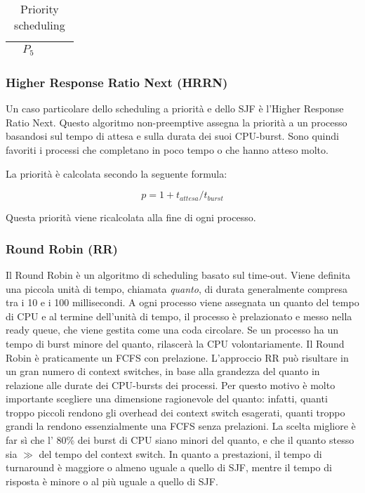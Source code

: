 \documentclass[a4paper]{article}
\begin{document}
\begin{table}[h]
\begin{tabular}{|c|ccccc|cccccccccc|ccc|c|}
                                                             & \multicolumn{5}{c|}{\cellcolor[HTML]{656565}$P_5$} & \multicolumn{10}{c|}{}                              & \multicolumn{3}{c|}{}                              &                                                                                                     \\ \hline
    \end{tabular}
    \caption{Priority scheduling}
\end{table}


\subsubsection{Higher Response Ratio Next (HRRN)}
Un caso particolare dello scheduling a priorità e dello SJF è l'Higher Response Ratio Next. Questo algoritmo non-preemptive assegna la priorità a un processo basandosi sul tempo di attesa e sulla durata dei suoi CPU-burst. Sono quindi favoriti i processi che completano in poco tempo o che hanno atteso molto.

La priorità è calcolata secondo la seguente formula:

$$
    p = 1 + t_{attesa}/t_{burst}
$$

Questa priorità viene ricalcolata alla fine di ogni processo.

\subsubsection{Round Robin (RR)}
Il Round Robin è un algoritmo di scheduling basato sul time-out. Viene definita una piccola unità di tempo, chiamata \textit{quanto}, di durata generalmente compresa tra i 10 e i 100 millisecondi. A ogni processo viene assegnata un quanto del tempo di CPU e al termine dell'unità di tempo, il processo è prelazionato e messo nella ready queue, che viene gestita come una coda circolare. Se un processo ha un tempo di burst minore del quanto, rilascerà la CPU volontariamente. Il Round Robin è praticamente un FCFS con prelazione.
L'approccio RR può risultare in un gran numero di context switches, in base alla grandezza del quanto in relazione alle durate dei CPU-bursts dei processi. Per questo motivo è molto importante scegliere una dimensione ragionevole del quanto: infatti, quanti troppo piccoli rendono gli overhead dei context switch esagerati, quanti troppo grandi la rendono essenzialmente una FCFS senza prelazioni. La scelta migliore è far sì che l' 80\% dei burst di CPU siano minori del quanto, e che il quanto stesso sia $\gg$ del tempo del context switch.\newline
In quanto a prestazioni, il tempo di turnaround è maggiore o almeno uguale a quello di SJF, mentre il tempo di risposta è minore o al più uguale a quello di SJF.
\end{document}
